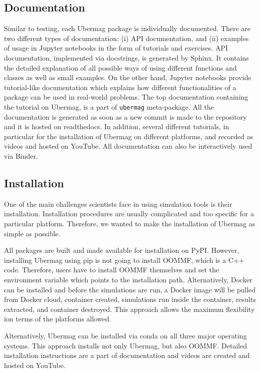\documentclass{deliverablereport}
\begin{document}
\subsection{Documentation}

Similar to testing, each Ubermag package is individually documented. There are two different types of documentation: (i) API documentation, and (ii) examples of usage in Jupyter notebooks in the form of tutorials and exercises. API documentation, implemented via docstrings, is generated by Sphinx. It contains the detailed explanation of all possible ways of using different functions and classes as well as small examples. On the other hand, Jupyter notebooks provide tutorial-like documentation which explains how different functionalities of a package can be used in real-world problems. The top documentation containing the tutorial on Ubermag, is a part of \texttt{ubermag} meta-package. All the documentation is generated as soon as a new commit is made to the repository and it is hosted on readthedocs. In addition, several different tutorials, in particular for the installation of Ubermag on different platforms, and recorded as videos and hosted on YouTube. All documentation can also be interactively used via Binder.

\subsection{Installation}

One of the main challenges scientists face in using simulation tools is their installation. Installation procedures are usually complicated and too specific for a particular platform. Therefore, we wanted to make the installation of Ubermag as simple as possible.

All packages are built and made available for installation on PyPI. However, installing Ubermag using pip is not going to install OOMMF, which is a C++ code. Therefore, users have to install OOMMF themselves and set the environment variable which points to the installation path. Alternatively, Docker can be installed and before the simulations are run, a Docker image will be pulled from Docker cloud, container created, simulations run inside the container, results extracted, and container destroyed. This approach allows the maximum flexibility ion terms of the platforms allowed.

Alternatively, Ubermag can be installed via conda on all three major operating systems. This approach installs not only Ubermag, but also OOMMF. Detailed installation instructions are a part of documentation and videos are created and hosted on YouTube.
\end{document}
